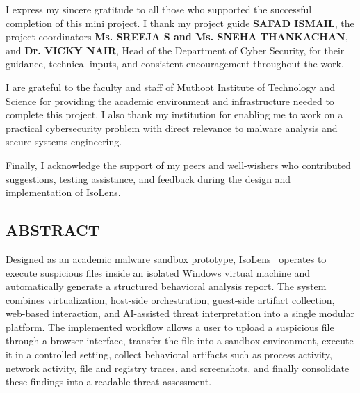 \documentclass[a4paper,12pt,oneside]{report}
\begin{document}
\noindent
I express my sincere gratitude to all those who supported the successful completion of this mini project. I thank my project guide \textbf{SAFAD ISMAIL}, the project coordinators \textbf{Ms. SREEJA S and Ms. SNEHA THANKACHAN}, and \textbf{Dr. VICKY NAIR}, Head of the Department of Cyber Security, for their guidance, technical inputs, and consistent encouragement throughout the work.

\par

\par

I are grateful to the faculty and staff of Muthoot Institute of Technology and Science for providing the academic environment and infrastructure needed to complete this project. I also thank my institution for enabling me to work on a practical cybersecurity problem with direct relevance to malware analysis and secure systems engineering.

\par

\par

Finally, I acknowledge the support of my peers and well-wishers who contributed suggestions, testing assistance, and feedback during the design and implementation of IsoLens.

\newpage
{}
\setcounter{page}{2}
\thispagestyle{plain}
\begin{center}
\section*{ABSTRACT}
\end{center}
\par

Designed as an academic malware sandbox prototype, IsoLens~\cite{isolens} operates to execute suspicious files inside an isolated Windows virtual machine and automatically generate a structured behavioral analysis report. The system combines virtualization, host-side orchestration, guest-side artifact collection, web-based interaction, and AI-assisted threat interpretation into a single modular platform. The implemented workflow allows a user to upload a suspicious file through a browser interface, transfer the file into a sandbox environment, execute it in a controlled setting, collect behavioral artifacts such as process activity, network activity, file and registry traces, and screenshots, and finally consolidate these findings into a readable threat assessment.
\end{document}
